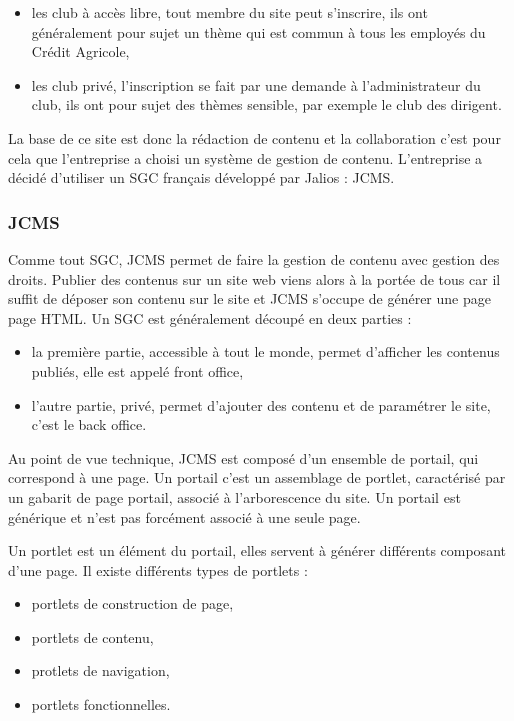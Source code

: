 \documentclass[12pt,a4paper]{article}
\begin{document}
\begin{itemize}
\item les club à accès libre, tout membre du site peut s'inscrire, ils ont généralement pour sujet un thème qui est commun à tous les employés du Crédit Agricole,
\item les club privé, l'inscription se fait par une demande à l'administrateur du club, ils ont pour sujet des thèmes sensible, par exemple le club des dirigent.
\end{itemize} \par 
\bigskip
La base de ce site est donc la rédaction de contenu et la collaboration c'est pour cela que l'entreprise a choisi un système de gestion de contenu. L'entreprise a décidé d'utiliser un SGC français développé par Jalios : JCMS.

\subsubsection{JCMS}
Comme tout SGC, JCMS permet de faire la gestion de contenu avec gestion des droits. Publier des contenus sur un site web viens alors à la portée de tous car il suffit de déposer son contenu sur le site et JCMS s'occupe de générer une page page HTML. Un SGC est généralement découpé en deux parties : 
\begin{itemize}
\item la première partie, accessible à tout le monde, permet d'afficher les contenus publiés, elle est appelé front office,
\item l'autre partie, privé, permet d'ajouter des contenu et de paramétrer le site, c'est le back office.
\end{itemize}\par
Au point de vue technique, JCMS est composé d'un ensemble de portail, qui correspond à une page. Un portail c'est un assemblage de portlet, caractérisé par un gabarit de page portail, associé à l'arborescence du site. Un portail est générique et n'est pas forcément associé à une seule page.\par 
Un portlet est un élément du portail, elles servent à générer différents composant d'une page. Il existe différents types de portlets : 
\begin{itemize}
\item portlets de construction de page,
\item portlets de contenu,
\item protlets de navigation,
\item portlets fonctionnelles.
\end{itemize}
\end{document}
